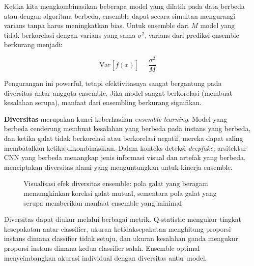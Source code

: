 Ketika kita mengkombinasikan beberapa model yang dilatih pada data berbeda atau dengan algoritma berbeda, ensemble dapat secara simultan mengurangi varians tanpa harus meningkatkan bias. Untuk ensemble dari $M$ model yang tidak berkorelasi dengan varians yang sama $\sigma^2$, varians dari prediksi ensemble berkurang menjadi:

\begin{equation}
\text{Var}[\bar{f}(x)] = \frac{\sigma^2}{M}
\label{eq:ensemble_variance}
\end{equation}

Pengurangan ini powerful, tetapi efektivitasnya sangat bergantung pada diversitas antar anggota ensemble. Jika model sangat berkorelasi (membuat kesalahan serupa), manfaat dari ensembling berkurang signifikan.

\textbf{Diversitas} merupakan kunci keberhasilan \textit{ensemble learning}. Model yang berbeda cenderung membuat kesalahan yang berbeda pada instans yang berbeda, dan ketika galat tidak berkorelasi atau berkorelasi negatif, mereka dapat saling membatalkan ketika dikombinasikan. Dalam konteks deteksi \textit{deepfake}, arsitektur CNN yang berbeda menangkap jenis informasi visual dan artefak yang berbeda, menciptakan diversitas alami yang menguntungkan untuk kinerja ensemble.

\begin{figure}[H]
    \centering
    \caption{Visualisasi efek diversitas ensemble: pola galat yang beragam memungkinkan koreksi galat mutual, sementara pola galat yang serupa memberikan manfaat ensemble yang minimal}
    \label{fig:ensemble_diversity}
\end{figure}

Diversitas dapat diukur melalui berbagai metrik. Q-statistic mengukur tingkat kesepakatan antar classifier, ukuran ketidaksepakatan menghitung proporsi instans dimana classifier tidak setuju, dan ukuran kesalahan ganda mengukur proporsi instans dimana kedua classifier salah. Ensemble optimal menyeimbangkan akurasi individual dengan diversitas antar model.

